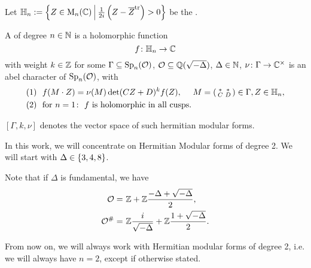 Let $\HalfPlane_n :=  \Set{ Z \in \M_n(\C) }{ \frac{1}{2 i} \left(Z - \overline{Z}^\tr \right) > 0}$ be the .

A  of degree $n\in\mathbb{N}$
is a holomorphic function
\[ f \colon \mathbb{H}_n \rightarrow \mathbb{C} \]
with weight $k\in \mathbb{Z}$ for some $\Gamma \subseteq \operatorname{Sp}_n(\mathcal{O})$, $\mathcal{O} \subseteq \mathbb{Q}(\sqrt{-\Delta})$, $\Delta \in \mathbb{N}$, $\nu \colon \Gamma \rightarrow \mathbb{C}^\times$ is an abel character of $\operatorname{Sp}_n(\mathcal{O})$, with
\begin{align*}
(1) \ \ & f(M \cdot Z) = \nu(M) \det(CZ + D)^k f(Z), \ \ \ \ M = \left( \begin{smallmatrix} * & * \\ C & D \end{smallmatrix} \right) \in \Gamma, Z \in \mathbb{H}_n , \\
(2) \ \ & \text{for } n = 1 \colon \ \text{$f$ is holomorphic in all cusps} .
\end{align*}

$[\Gamma, k, \nu]$ denotes the vector space of such hermitian modular forms.

In this work, we will concentrate on Hermitian Modular forms of degree 2. We will start with $\Delta \in \Set{3,4,8}$.

Note that if $\Delta$ is fundamental, we have
\begin{align*}
\mathcal{O} = &\ \mathbb{Z} +  \mathbb{Z} \frac{-\Delta+\sqrt{-\Delta}}{2} , \\
\mathcal{O}^\# = & \ \mathbb{Z} \frac{i}{\sqrt{-\Delta}} + \mathbb{Z} \frac{1 + \sqrt{-\Delta}}{2} .
\end{align*}

From now on, we will always work with Hermitian modular forms of degree 2, i.e. we will always have $n=2$, except if otherwise stated.

